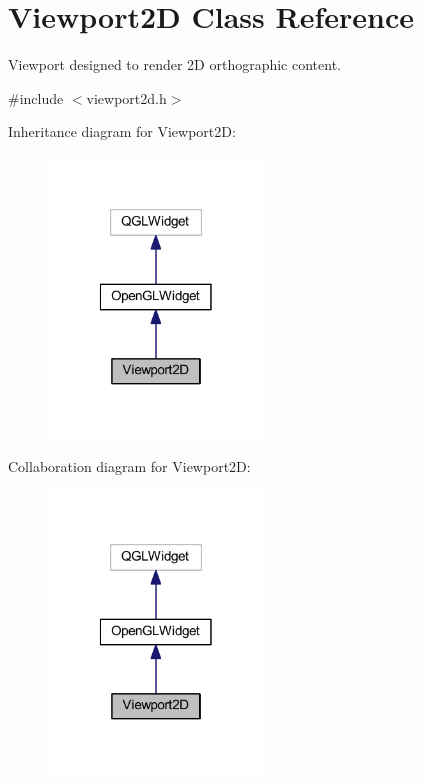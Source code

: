 \hypertarget{class_viewport2_d}{\section{Viewport2\-D Class Reference}
\label{class_viewport2_d}
}


Viewport designed to render 2\-D orthographic content.  




{\ttfamily \#include $<$viewport2d.\-h$>$}



Inheritance diagram for Viewport2\-D\-:
\nopagebreak
\begin{figure}[H]
\begin{center}
\leavevmode
\includegraphics[width=162pt]{class_viewport2_d__inherit__graph}
\end{center}
\end{figure}


Collaboration diagram for Viewport2\-D\-:
\nopagebreak
\begin{figure}[H]
\begin{center}
\leavevmode
\includegraphics[width=162pt]{class_viewport2_d__coll__graph}
\end{center}
\end{figure}
